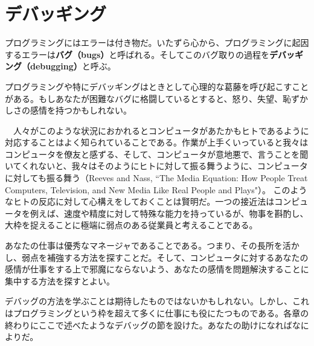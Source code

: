 \documentclass[a4j,12pt,makeidx]{jbook}
\begin{document}
\section{デバッギング}
プログラミングにはエラーは付き物だ。いたずら心から、プログラミングに起因するエラーは{\bf バグ（bugs）}と呼ばれる。そしてこのバグ取りの過程を{\bf デバッギング（debugging）}と呼ぶ。\par
プログラミングや特にデバッギングはときとして心理的な葛藤を呼び起こすことがある。もしあなたが困難なバグに格闘しているとすると、怒り、失望、恥ずかしさの感情を持つかもしれない。\par
　人々がこのような状況におかれるとコンピュータがあたかもヒトであるように対応することはよく知られていることである。作業が上手くいっていると我々はコンピュータを僚友と感ずる、そして、コンピュータが意地悪で、言うことを聞いてくれないと、我々はそのようにヒトに対して振る舞うように、コンピュータに対しても振る舞う（Reeves and Nass, ``The Media Equation: How People Treat Computers, Television, and New Media Like Real People and Plays"）。
このようなヒトの反応に対して心構えをしておくことは賢明だ。一つの接近法はコンピュータを例えば、速度や精度に対して特殊な能力を持っているが、物事を斟酌し、大枠を捉えることに極端に弱点のある従業員と考えることである。\par
あなたの仕事は優秀なマネージャであることである。つまり、その長所を活かし、弱点を補強する方法を探すことだ。そして、コンピュータに対するあなたの感情が仕事をする上で邪魔にならないよう、あなたの感情を問題解決することに集中する方法を探すとよい。\par
デバッグの方法を学ぶことは期待したものではないかもしれない。しかし、これはプログラミングという枠を超えて多くに仕事にも役にたつものである。各章の終わりにここで述べたようなデバッグの節を設けた。あなたの助けになればなによりだ。
%
\end{document}
